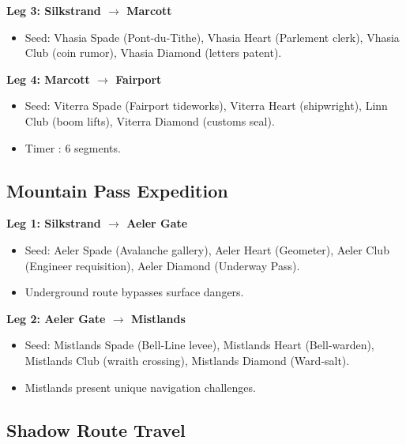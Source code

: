 \textbf{Leg 3: Silkstrand $\rightarrow$ Marcott}
\begin{itemize}
    \item Seed: Vhasia Spade (Pont‑du‑Tithe), Vhasia Heart (Parlement clerk), Vhasia Club (coin rumor), Vhasia Diamond (letters patent).
\end{itemize}

\textbf{Leg 4: Marcott $\rightarrow$ Fairport}
\begin{itemize}
    \item Seed: Viterra Spade (Fairport tideworks), Viterra Heart (shipwright), Linn Club (boom lifts), Viterra Diamond (customs seal).
    \item Timer : 6 segments.
\end{itemize}

\subsection{Mountain Pass Expedition}\label{subsec:mountain_pass}

\textbf{Leg 1: Silkstrand $\rightarrow$ Aeler Gate}
\begin{itemize}
    \item Seed: Aeler Spade (Avalanche gallery), Aeler Heart (Geometer), Aeler Club (Engineer requisition), Aeler Diamond (Underway Pass).
    \item Underground route bypasses surface dangers.
\end{itemize}

\textbf{Leg 2: Aeler Gate $\rightarrow$ Mistlands}
\begin{itemize}
    \item Seed: Mistlands Spade (Bell‑Line levee), Mistlands Heart (Bell‑warden), Mistlands Club (wraith crossing), Mistlands Diamond (Ward‑salt).
    \item Mistlands present unique navigation challenges.
\end{itemize}

\subsection{Shadow Route Travel}\label{subsec:shadow_route}

